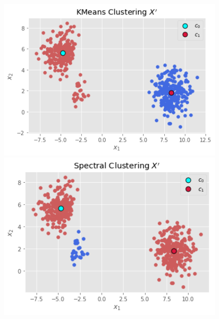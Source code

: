 \documentclass{beamer}
\begin{document}
\begin{frame}
\begin{figure}[H]
		\begin{minipage}[t]{0.30\linewidth}
			\centering
			\includegraphics[width=1\textwidth]{img/target/kmeansXadv.png}
		\end{minipage}        
		\hspace{.1cm}
		\begin{minipage}[t]{0.30\linewidth}
			\centering
			\includegraphics[width=1\textwidth]{img/target/spectralXadv.png}
		\end{minipage}
		\hspace{.1cm}
		\begin{minipage}[t]{0.30\linewidth}
		\centering

\end{minipage}
\end{figure}
\end{frame}
\end{document}
